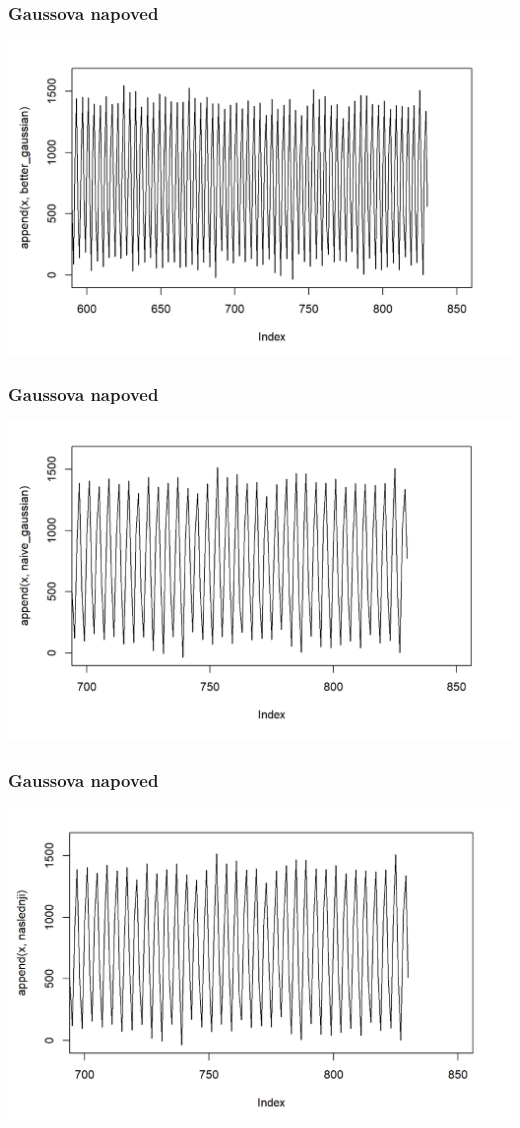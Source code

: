 \documentclass[10pt]{beamer}
\begin{document}
\begin{frame}
\frametitle{Gaussova napoved}
\includegraphics[width=1\textwidth]{betterA.png}
\end{frame}
\begin{frame}
\frametitle{Gaussova napoved}
\includegraphics[width=1\textwidth]{naiveA.png}
\end{frame}
\begin{frame}
\frametitle{Gaussova napoved}
\includegraphics[width=1\textwidth]{naslednjiA.png}
\end{frame}
\end{document}
